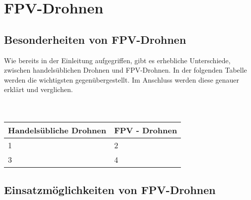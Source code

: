 \section[FPV-Drohnen]{FPV-Drohnen}
\subsection[Besonderheiten von FPV-Drohnen]{Besonderheiten von FPV-Drohnen}

Wie bereits in der Einleitung aufgegriffen, gibt es erhebliche Unterschiede, zwischen handelsüblichen Drohnen und FPV-Drohnen. In der folgenden Tabelle werden die wichtigsten gegenübergestellt. Im Anschluss werden diese genauer erklärt und verglichen. 
\\ \\ \\
\renewcommand{\arraystretch}{1.5}
\begin{tabular}{p{8cm}p{8cm}}
    \toprule
    \textbf{Handelsübliche Drohnen} & \textbf{FPV - Drohnen} \\
    \midrule
    1 & 2 \\
    3 & 4 \\
    \bottomrule
\end{tabular}







\subsection[Einsatzmöglichkeiten von FPV-Drohnen]{Einsatzmöglichkeiten von FPV-Drohnen}
